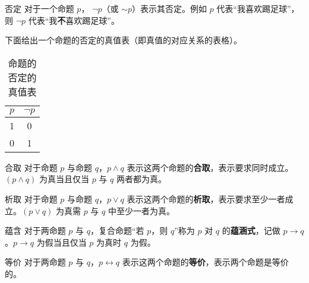 
\begin{definition}{否定}
对于一个命题 $p$， $\neg p$（或 $\sim p$）表示其否定。例如 $p$ 代表“我喜欢踢足球”，则 $\neg p$ 代表“我\textbf{不}喜欢踢足球”。
\end{definition}

下面给出一个命题的否定的真值表（即真值的对应关系的表格）。
\begin{table}[ht]
\centering
\caption{命题的否定的真值表}\label{tab_propco1}
\begin{tabular}{|c|c|}
\hline
$p$ & $\neg p$ \\
\hline
1 & 0 \\
0 & 1 \\
\hline
\end{tabular}
\end{table}


\begin{definition}{合取}
对于命题 $p$ 与命题 $q$，$p \land q$ 表示这两个命题的\textbf{合取}，表示要求同时成立。$(p \land q)$ 为真当且仅当 $p$ 与 $q$ 两者都为真。
\end{definition}

\begin{definition}{析取}
对于命题 $p$ 与命题 $q$，$p \lor q$ 表示这两个命题的\textbf{析取}，表示要求至少一者成立。$(p \lor q)$ 为真需 $p$ 与 $q$ 中至少一者为真。
\end{definition}

\begin{definition}{蕴含}
对于两命题 $p$ 与 $q$，复合命题“若 $p$，则 $q$”称为 $p$ 对 $q$ 的\textbf{蕴涵式}，记做 $p \to q$。$p \to q$ 为假当且仅当 $p$ 为真时 $q$ 为假。
\end{definition}

\begin{definition}{等价}
对于两命题 $p$ 与 $q$，$p \leftrightarrow q$ 表示这两个命题的\textbf{等价}，表示两个命题是等价的。
\end{definition}


